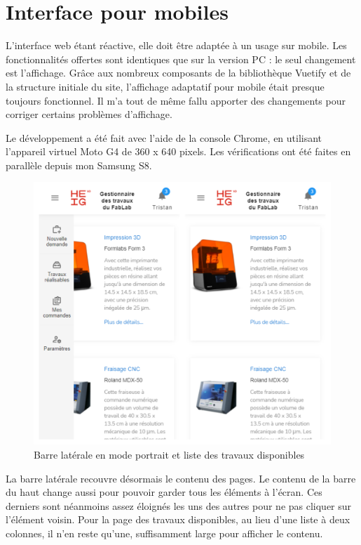 \documentclass[
    iai, %
    eai, %
]{heig-tb}
\begin{document}
\newpage
\section{Interface pour mobiles}
L'interface web étant réactive, elle doit être adaptée à un usage sur mobile. Les fonctionnalités offertes sont identiques que sur la version PC : le seul changement est l'affichage.
Grâce aux nombreux composants de la bibliothèque Vuetify et de la structure initiale du site, l'affichage adaptatif pour mobile était presque toujours fonctionnel. Il m'a tout de même fallu apporter des changements pour corriger certains problèmes d'affichage.

Le développement a été fait avec l'aide de la console Chrome, en utilisant l'appareil virtuel Moto G4 de 360 x 640 pixels. Les vérifications ont été faites en parallèle depuis mon Samsung S8.

\begin{figure}[h]
  \centering
  \includegraphics[width=12cm]{ui_mobile_joblist_portrait.PNG}
  \caption{Barre latérale en mode portrait et liste des travaux disponibles}
\end{figure}

La barre latérale recouvre désormais le contenu des pages. Le contenu de la barre du haut change aussi pour pouvoir garder tous les éléments à l'écran. Ces derniers sont néanmoins assez éloignés les uns des autres pour ne pas cliquer sur l'élément voisin.
Pour la page des travaux disponibles, au lieu d'une liste à deux colonnes, il n'en reste qu'une, suffisamment large pour afficher le contenu.
\end{document}
